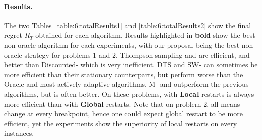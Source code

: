 \paragraph{Results.}
\label{sub:6:NumericalResults}


The two Tables~\ref{table:6:totalResults1} and \ref{table:6:totalResults2} show the final regret $R_T$ obtained for each algorithm.
Results highlighted in \textbf{bold} show the best non-oracle algorithm for each experiments,
with our proposal being the best non-oracle strategy for problems $1$ and $2$.
Thompson sampling and \klUCB{} are efficient,
and better than Discounted-\klUCB{} which is very inefficient.
DTS and SW-\klUCB{} can sometimes be more efficient than their stationary counterparts, but perform worse than the Oracle and most actively adaptive algorithms.
M-\klUCB{} and \CUSUMklUCB{} outperform the previous algorithms, but \GLRklUCB{} is often better.
%
On these problems, \GLRklUCB{} with \textbf{Local} restarts is always more efficient than with \textbf{Global} restarts. Note that on problem 2, all means change at every breakpoint, hence one could expect global restart to be more efficient, yet the experiments show the superiority of local restarts on every instances.

